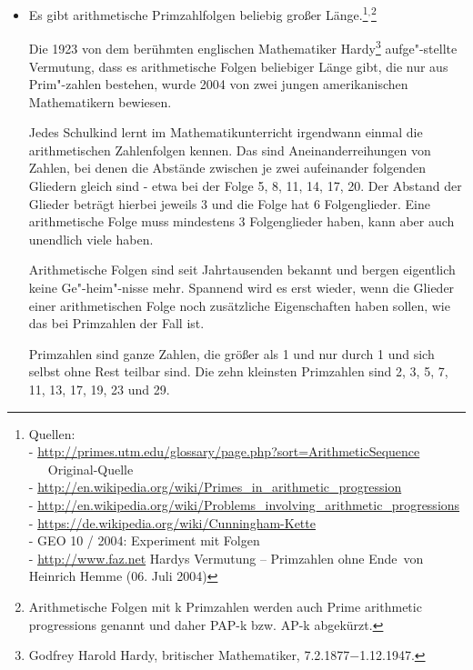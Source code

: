 \begin{refsegment}
\begin{itemize}
  \item \hypertarget{link-Arithmetic-sequence-of-primes}{}
     Es gibt arithmetische Primzahlfolgen 
     beliebig großer Länge.\footnote{%
     Quellen: \\
     - \url{http://primes.utm.edu/glossary/page.php?sort=ArithmeticSequence}
         ~~~Original-Quelle\\
     - \url{http://en.wikipedia.org/wiki/Primes_in_arithmetic_progression}\\
     - \url{http://en.wikipedia.org/wiki/Problems_involving_arithmetic_progressions}\\
     - \url{https://de.wikipedia.org/wiki/Cunningham-Kette}\\
     - GEO 10 / 2004: \glqq Experiment mit Folgen\grqq\\
     - \url{http://www.faz.net}
       \glqq Hardys Vermutung -- Primzahlen ohne Ende\grqq~von Heinrich Hemme (06. Juli 2004)
     }$^,$\footnote{%
     Arithmetische Folgen mit k Primzahlen werden auch Prime arithmetic progressions
     genannt und daher PAP-k bzw. AP-k abgekürzt.
     }

     Die 1923 von dem berühmten englischen Mathematiker Hardy\footnote{%
     Godfrey Harold Hardy, britischer
     Mathematiker, 7.2.1877$-$1.12.1947.}
     aufge"-stellte Vermutung, dass es arithmetische Folgen beliebiger Länge
     gibt, die nur aus Prim"-zahlen bestehen, wurde 2004 von zwei jungen
     amerikanischen Mathematikern bewiesen.

     Jedes Schulkind lernt im Mathematikunterricht irgendwann einmal die
     arithmetischen Zahlenfolgen kennen. Das sind Aneinanderreihungen von
     Zahlen, bei denen die Abstände zwischen je zwei aufeinander folgenden
     Gliedern gleich sind - etwa bei der Folge 5, 8, 11, 14, 17, 20. Der
     Abstand der Glieder beträgt hierbei jeweils 3 und die Folge hat 6
     Folgenglieder. Eine arithmetische Folge muss mindestens 3 Folgenglieder
     haben, kann aber auch unendlich viele haben.

     Arithmetische Folgen sind seit Jahrtausenden bekannt und bergen eigentlich
     keine Ge"-heim"-nisse mehr.
     Spannend wird es erst wieder, wenn die Glieder einer arithmetischen Folge
     noch zusätzliche Eigenschaften haben sollen, wie das bei Primzahlen der
     Fall ist.

     Primzahlen sind ganze Zahlen, die größer als 1 und nur durch 1 und sich
     selbst ohne Rest teilbar sind. Die zehn kleinsten Primzahlen sind
     2, 3, 5, 7, 11, 13,  17, 19, 23 und 29.


\end{itemize}
\end{refsegment}
